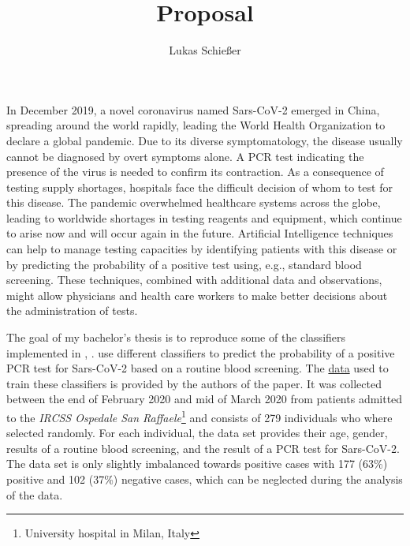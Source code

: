 \documentclass[12pt,a4paper,oneside]{article}
\title{Proposal}
\author{Lukas Schießer}
\date{}
\begin{document}
\maketitle
In December 2019, a novel coronavirus named Sars-CoV-2 emerged in China, spreading around the world rapidly, leading the World Health Organization to declare a global pandemic. Due to its diverse symptomatology, the disease usually cannot be diagnosed by overt symptoms alone. A PCR test indicating the presence of the virus is needed to confirm its contraction.
As a consequence of testing supply shortages, hospitals face the difficult decision of whom to test for this disease.
The pandemic overwhelmed healthcare systems across the globe, leading to worldwide shortages in testing reagents and equipment, which continue to arise now and will occur again in the future. \cite{jaecklin_2020, asm.org_2020}
Artificial Intelligence techniques can help to manage testing capacities by identifying patients with this disease or by predicting the probability of a positive test using, e.g., standard blood screening. These techniques, combined with additional data and observations, might allow physicians and health care workers to make better decisions about the administration of tests.
\par
The goal of my bachelor's thesis is to reproduce some of the classifiers implemented in \citeauthor{RN127}, \citeyear{RN127} \cite{RN127}. \citeauthor{RN127} use different classifiers to predict the probability of a positive PCR test for Sars-CoV-2 based on a routine blood screening. The \href{https://zenodo.org/record/3886927/files/covid_study_v2.xlsx?download=1}{data} used to train these classifiers is provided by the authors of the paper. It was collected between the end of February 2020 and mid of March 2020 from patients admitted to the \textit{IRCSS Ospedale San Raffaele}\footnote{University hospital in Milan, Italy} and consists of 279 individuals who where selected randomly. For each individual, the data set provides their age, gender, results of a routine blood screening, and the result of a PCR test for Sars-CoV-2. The data set is only slightly imbalanced towards positive cases with 177 (63\%) positive and 102 (37\%) negative cases, which can be neglected during the analysis of the data.
\par
\end{document}
